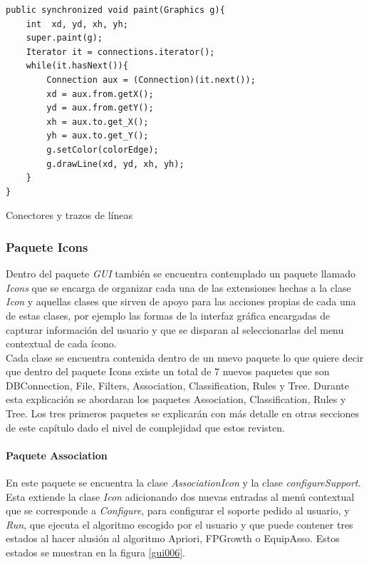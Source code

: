 \begin{codigof}[t]
\begin{verbatim}
public synchronized void paint(Graphics g){
    int  xd, yd, xh, yh;
    super.paint(g);
    Iterator it = connections.iterator();
    while(it.hasNext()){
        Connection aux = (Connection)(it.next());
        xd = aux.from.getX();
        yd = aux.from.getY();
        xh = aux.to.get_X();
        yh = aux.to.get_Y();
        g.setColor(colorEdge);
        g.drawLine(xd, yd, xh, yh);
    }
}
\end{verbatim}
\caption{Conectores y trazos de l\'ineas}
\label{codgui8}
\end{codigof}
\subsubsection{Paquete Icons}
Dentro del paquete \textit{GUI} tambi\'en se encuentra contemplado un paquete llamado \textit{Icons} que se
encarga de organizar cada una de las extensiones hechas a la clase \textit{Icon} y aquellas clases que sirven de
apoyo para las acciones propias de cada una de estas clases, por ejemplo las formas de la interfaz gr\'afica
encargadas de capturar informaci\'on del usuario y que se disparan al seleccionarlas del menu contextual de cada
\'icono.\\

Cada clase se encuentra contenida dentro de un nuevo paquete lo que quiere decir que dentro del paquete Icons
existe un total de 7 nuevos paquetes que son DBConnection, File, Filters, Association, Classification, Rules y
Tree.  Durante esta explicaci\'on se abordaran los paquetes Association, Classification, Rules y Tree.  Los tres
primeros paquetes se explicar\'an con m\'as detalle en otras secciones de este cap\'itulo dado el nivel de
complejidad que estos revisten.
\paragraph{Paquete Association}
En este paquete se encuentra la clase \textit{AssociationIcon} y la clase \textit{configureSupport}.  Esta
extiende la clase \textit{Icon} adicionando dos nuevas entradas al men\'u contextual que se corresponde a
\textit{Configure}, para configurar el soporte pedido al usuario, y \textit{Run}, que ejecuta el algoritmo
escogido por el usuario y que puede contener tres estados al hacer alusi\'on al algoritmo Apriori, FPGrowth o
EquipAsso.  Estos estados se muestran en la figura \ref{gui006}.\\


